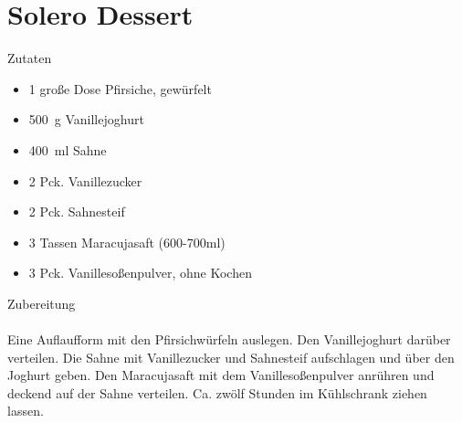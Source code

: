 \section*{Solero Dessert}
\ihead{}\ohead{}
\cfoot{}
{\Large Zutaten}
\begin{multicols}{2}
\begin{itemize}
    \item \num{1} große Dose Pfirsiche, gewürfelt
    \item \SI{500}{g} Vanillejoghurt
    \item \SI{400}{ml} Sahne
    \item \num{2} Pck. Vanillezucker
    \item \num{2} Pck. Sahnesteif
    \item \num{3} Tassen Maracujasaft (600-700ml)
    \item \num{3} Pck. Vanillesoßenpulver, ohne Kochen
\end{itemize}
\end{multicols}
\noindent
{\Large Zubereitung}\\
\\
Eine Auflaufform mit den Pfirsichwürfeln auslegen.
Den Vanillejoghurt darüber verteilen.
Die Sahne mit Vanillezucker und Sahnesteif aufschlagen und über den Joghurt geben.
Den Maracujasaft mit dem Vanillesoßenpulver anrühren und deckend auf der Sahne verteilen.
Ca. zwölf Stunden im Kühlschrank ziehen lassen.
